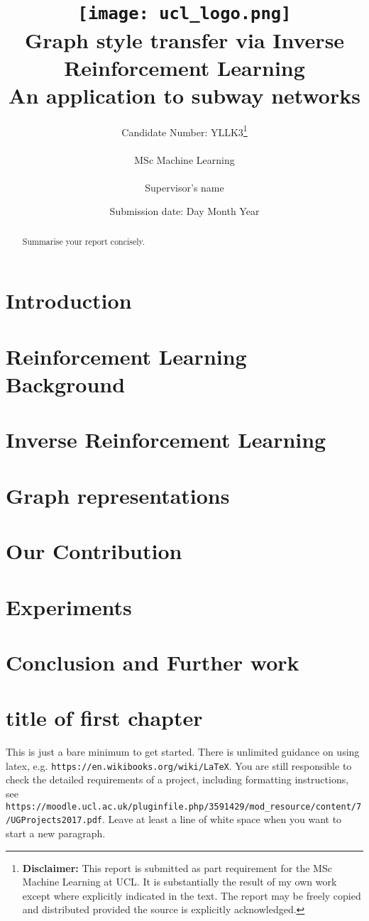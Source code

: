 \documentclass{report}
\title{
  { \texttt{[image: ucl\_logo.png]}}\\
  {{\Huge Graph style transfer via Inverse Reinforcement Learning}}\\
  {\large An application to subway networks}\\
}
\date{Submission date: Day Month Year}
\author{
  Candidate Number: YLLK3\thanks{
      {\bf Disclaimer:}
      This report is submitted as part requirement 
      for the MSc Machine Learning at UCL. It is
      substantially the result of my own work except 
      where explicitly indicated in the text.
      The report may be freely copied and 
      distributed provided the source is explicitly acknowledged.
    }
    \\ \\
  MSc Machine Learning\\ \\
  Supervisor's name
}
\numberwithin{equation}{section}
\numberwithin{figure}{section}
\numberwithin{table}{section}
\begin{document}
\onehalfspacing
\maketitle

\begin{abstract}
  Summarise your report concisely.
\end{abstract}
\tableofcontents
\setcounter{page}{1}

\chapter{Introduction}
\chapter{Reinforcement Learning Background}
\chapter{Inverse Reinforcement Learning}
\chapter{Graph representations}
\chapter{Our Contribution}
\chapter{Experiments}
\chapter{Conclusion and Further work}


\chapter{title of first chapter}
This is just a bare minimum to get started.  There is unlimited guidance on using latex, e.g. {\tt https://en.wikibooks.org/wiki/LaTeX}.   You are still responsible to check the detailed requirements of a project, including formatting instructions, see \\
{\tt https://moodle.ucl.ac.uk/pluginfile.php/3591429/mod\_resource/content/7/UGProjects2017.pdf}.
Leave at least a line of white space when you want to start a new paragraph.
\end{document}
